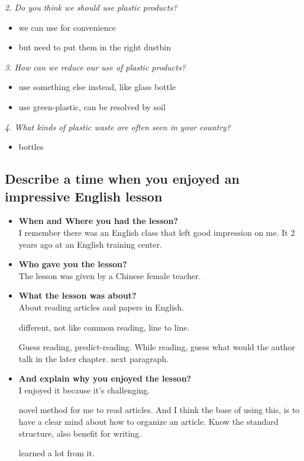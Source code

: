 \documentclass[conference]{IEEEtran}
\begin{document}
\textit{2. Do you think we should use plastic products?}
\begin{itemize}
    \item we can use for convenience
    \item but need to put them in the right dustbin
\end{itemize}

\textit{3. How can we reduce our use of plastic products?}
\begin{itemize}
    \item use something else instead, like glass bottle
    \item use green-plastic, can be resolved by soil
\end{itemize}

\textit{4. What kinds of plastic waste are often seen in your country?}
\begin{itemize}
    \item bottles
\end{itemize}

\subsection{Describe a time when you enjoyed an impressive English lesson}
\begin{itemize}
    \item \textbf{When and Where you had the lesson?}\\
    I remember there was an English class that left good impression on me.
    It 2 years ago at an English training center.
    \item \textbf{Who gave you the lesson?}\\
    The lesson was given by a Chinese female teacher. 
    \item \textbf{What the lesson was about?}\\
    About reading articles and papers in English.

    different, not like common reading, line to line.

    Guess reading, predict-reading. While reading, guess what would the author talk in the later chapter.
    next paragraph.
    \item \textbf{And explain why you enjoyed the lesson?}\\
    I enjoyed it because it's challenging.

    novel method for me to read articles. And I think the base of using this, is to have a clear mind about
    how to organize an article.
    Know the standard structure, also benefit for writing.

    learned a lot from it.
\end{itemize}
\end{document}
